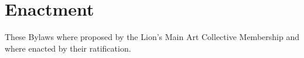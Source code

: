 \chapter{Enactment}\label{sec:enactment}
These Bylaws where proposed by the Lion's Main Art Collective Membership and where enacted \dateapproved by their ratification.
